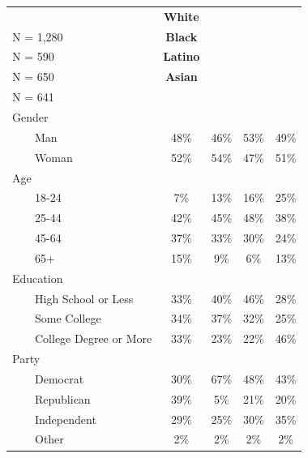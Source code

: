 \begin{table}[t]
\fontsize{12.0pt}{14.0pt}\selectfont
\begin{tabular*}{\linewidth}{@{\extracolsep{\fill}}lcccc}
\toprule
 & \textbf{White}\\
N = 1,280 & \textbf{Black}\\
N = 590 & \textbf{Latino}\\
N = 650 & \textbf{Asian}\\
N = 641 \\ 
\midrule\addlinespace[2.5pt]
Gender &  &  &  &  \\ 
    Man & 48\% & 46\% & 53\% & 49\% \\ 
    Woman & 52\% & 54\% & 47\% & 51\% \\ 
Age &  &  &  &  \\ 
    18-24 & 7\% & 13\% & 16\% & 25\% \\ 
    25-44 & 42\% & 45\% & 48\% & 38\% \\ 
    45-64 & 37\% & 33\% & 30\% & 24\% \\ 
    65+ & 15\% & 9\% & 6\% & 13\% \\ 
Education &  &  &  &  \\ 
    High School or Less & 33\% & 40\% & 46\% & 28\% \\ 
    Some College & 34\% & 37\% & 32\% & 25\% \\ 
    College Degree or More & 33\% & 23\% & 22\% & 46\% \\ 
Party &  &  &  &  \\ 
    Democrat & 30\% & 67\% & 48\% & 43\% \\ 
    Republican & 39\% & 5\% & 21\% & 20\% \\ 
    Independent & 29\% & 25\% & 30\% & 35\% \\ 
    Other & 2\% & 2\% & 2\% & 2\% \\ 
\bottomrule
\end{tabular*}
\end{table}

